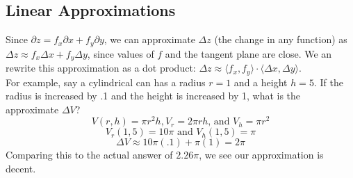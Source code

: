 \subsection{Linear Approximations}
\noindent
Since $\partial z = f_x\partial x + f_y\partial y$, we can approximate $\Delta z$ (the change in any function) as $\Delta z \approx f_x\Delta x + f_y\Delta y$, since values of $f$ and the tangent plane are close. We an rewrite this approximation as a dot product: $\Delta z \approx \langle f_x, f_y\rangle \cdot \langle \Delta x, \Delta y \rangle$.\\

For example, say a cylindrical can has a radius $r=1$ and a height $h=5$. If the radius is increased by .1 and the height is increased by 1, what is the approximate $\Delta V$?
\begin{equation*}
	V(r,h) = \pi r^2 h, V_r = 2\pi rh \text{, and } V_h = \pi r^2
\end{equation*}
\begin{equation*}
	V_{r}(1,5) = 10\pi  \text{ and } V_{h}(1,5) = \pi
\end{equation*}
\begin{equation*}
	\Delta V \approx 10\pi(.1) + \pi(1) = 2\pi	
\end{equation*}
Comparing this to the actual answer of $2.26\pi$, we see our approximation is decent.